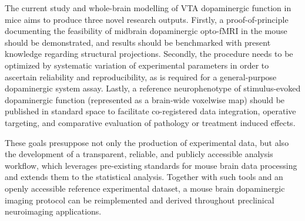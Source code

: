 The current study and whole-brain modelling of VTA dopaminergic function in mice aims to produce three novel research outputs.
Firstly, a proof-of-principle documenting the feasibility of midbrain dopaminergic opto-fMRI in the mouse should be demonstrated, and results should be benchmarked with present knowledge regarding structural projections.
Secondly, the procedure needs to be optimized by systematic variation of experimental parameters in order to ascertain reliability and reproducibility, as is required for a general-purpose dopaminergic system assay.
Lastly, a reference neurophenotype of stimulus-evoked dopaminergic function (represented as a brain-wide voxelwise map) should be published in standard space to facilitate co-registered data integration, operative targeting, and comparative evaluation of pathology or treatment induced effects.

These goals presuppose not only the production of experimental data, but also the development of a transparent, reliable, and publicly accessible analysis workflow, which leverages pre-existing standards for mouse brain data processing \cite{irsabi} and extends them to the statistical analysis.
Together with such tools and an openly accessible reference experimental dataset, a mouse brain dopaminergic imaging protocol can be reimplemented and derived throughout preclinical neuroimaging applications.
